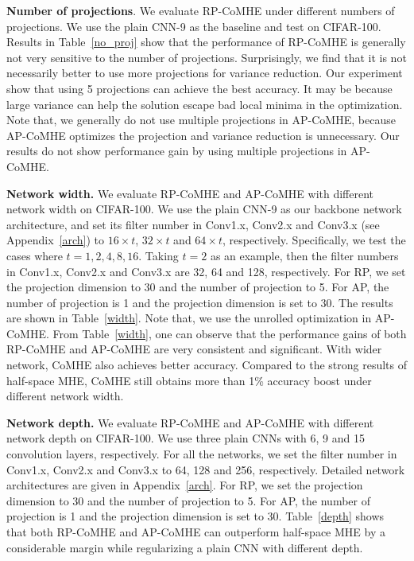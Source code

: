 \textbf{Number of projections}. We evaluate RP-CoMHE under different numbers of projections. We use the plain CNN-9 as the baseline and test on CIFAR-100. Results in Table~\ref{no_proj} show that the performance of RP-CoMHE is generally not very sensitive to the number of projections. Surprisingly, we find that it is not necessarily better to use more projections for variance reduction. Our experiment show that using 5 projections can achieve the best accuracy. It may be because large variance can help the solution escape bad local minima in the optimization. Note that, we generally do not use multiple projections in AP-CoMHE, because AP-CoMHE optimizes the projection and variance reduction is unnecessary. Our results do not show performance gain by using multiple projections in AP-CoMHE.

\par
\textbf{Network width.} We evaluate RP-CoMHE and AP-CoMHE with different network width on CIFAR-100. We use the plain CNN-9 as our backbone network architecture, and set its filter number in Conv1.x, Conv2.x and Conv3.x (see Appendix~\ref{arch}) to $16\times t$, $32\times t$ and $64\times t$, respectively. Specifically, we test the cases where $t=1,2,4,8,16$. Taking $t=2$ as an example, then the filter numbers in Conv1.x, Conv2.x and Conv3.x are 32, 64 and 128, respectively. For RP, we set the projection dimension to 30 and the number of projection to 5. For AP, the number of projection is 1 and the projection dimension is set to 30. The results are shown in Table~\ref{width}. Note that, we use the unrolled optimization in AP-CoMHE. From Table~\ref{width}, one can observe that the performance gains of both RP-CoMHE and AP-CoMHE are very consistent and significant. With wider network, CoMHE also achieves better accuracy. Compared to the strong results of half-space MHE, CoMHE still obtains more than 1\% accuracy boost under different network width.

\par
\textbf{Network depth.} We evaluate RP-CoMHE and AP-CoMHE with different network depth on CIFAR-100. We use three plain CNNs with 6, 9 and 15 convolution layers, respectively. For all the networks, we set the filter number in Conv1.x, Conv2.x and Conv3.x to 64, 128 and 256, respectively. Detailed network architectures are given in Appendix~\ref{arch}. For RP, we set the projection dimension to 30 and the number of projection to 5. For AP, the number of projection is 1 and the projection dimension is set to 30. Table~\ref{depth} shows that both RP-CoMHE and AP-CoMHE can outperform half-space MHE by a considerable margin while regularizing a plain CNN with different depth.

